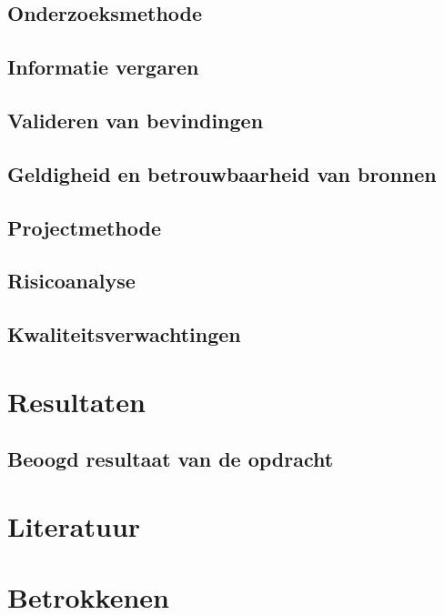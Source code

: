 \documentclass{report}
\begin{document}
\section{Onderzoeksmethode}

\section{Informatie vergaren}

\section{Valideren van bevindingen}

\section{Geldigheid en betrouwbaarheid van bronnen}

\section{Projectmethode}

\section{Risicoanalyse}

\section{Kwaliteitsverwachtingen}


\chapter{Resultaten}

\section{Beoogd resultaat van de opdracht}


\chapter{Literatuur}






\chapter{Betrokkenen}
\end{document}
